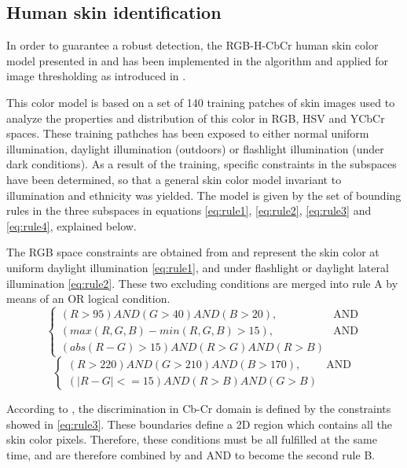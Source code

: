 \subsection{Human skin identification}
In order to guarantee a robust detection, the RGB-H-CbCr human skin color model presented
in \cite{Ref:SkinColorModel} and \cite{Ref:SkinDetection} has been implemented in the algorithm
and applied for image thresholding as introduced in \cite{Ref:SkinDetection}. 

This color model is based on a set of 140 training patches of skin images used to analyze the properties and
distribution of this color in RGB, HSV and YCbCr spaces.  These training pathches has been exposed
to either normal uniform illumination, daylight illumination (outdoors) or flashlight illumination (under dark conditions). 
As a result of the training, specific constraints in the subspaces have been determined,
so that a general skin color model invariant to illumination and ethnicity was yielded. 
The model is given by the set of bounding rules in the three subspaces in 
equations \ref{eq:rule1}, \ref{eq:rule2}, \ref{eq:rule3} and \ref{eq:rule4}, explained below.

The RGB space constraints are obtained from \cite{Ref:SkinColorModel} and represent the skin
color at uniform daylight illumination \ref{eq:rule1}, and under flashlight or daylight lateral
illumination \ref{eq:rule2}. These two excluding conditions are merged into rule A by means of an OR logical condition.
\begin{equation}
		\begin{cases}
		    (R > 95) AND (G > 40) AND (B > 20),& \text{AND}\\
		    (max(R, G, B) - min(R, G, B) > 15), & \text{AND}\\
		    (abs(R - G) > 15) AND (R > G) AND (R > B)
		\end{cases}
		\label{eq:rule1}
\end{equation}
\begin{equation}
		\begin{cases}
		    (R > 220) AND (G > 210) AND (B > 170),& \text{AND}\\
			(|R - G| <= 15) AND (R > B) AND (G > B)
		\end{cases}
	\label{eq:rule2}
\end{equation}

According to \cite{Ref:SkinDetection}, the discrimination in Cb-Cr domain is defined by the constraints showed in \ref{eq:rule3}.  
These boundaries define a 2D region which contains all the skin color pixels. 
Therefore, these conditions must be all fulfilled at the same time, and are therefore combined by and AND to become the second rule B.

